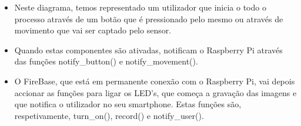 \documentclass{article}
\begin{document}
\begin{itemize}
    \item Neste diagrama, temos representado um utilizador que inicia o todo o processo através de um botão que é pressionado pelo mesmo ou através de movimento que vai ser captado pelo sensor.

    \item Quando estas componentes são ativadas, notificam o Raspberry Pi através das funções notify\_button() e notify\_movement().

    \item O FireBase, que está em permanente conexão com o Raspberry Pi, vai depois accionar as funções para ligar os LED's, que começa a gravação das imagens e que notifica o utilizador no seu smartphone. Estas funções são, respetivamente, turn\_on(), record() e notify\_user().

\end{itemize}

\iffalse
\section{Gantt Chart}

\begin{figure}[h!]
    \centering
    \texttt{[image: diagramas/Gant\_chart.png]}
    \caption{Diagrama de Gantt}
    \label{fig:diagGantt}
\end{figure}
\fi






%
%
%
% 
\end{document}
